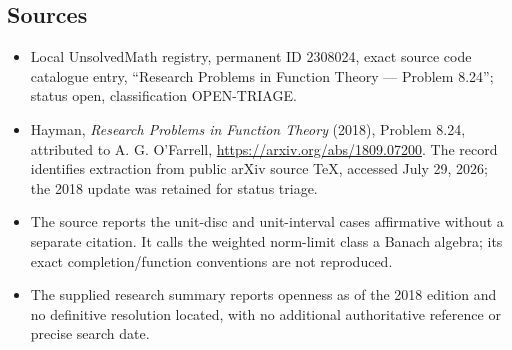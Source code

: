 \documentclass[11pt]{article}
\begin{document}
\subsection{Sources}
\begin{itemize}
\item Local UnsolvedMath registry, permanent ID 2308024, exact source code catalogue entry, ``Research Problems in Function Theory --- Problem 8.24''; status open, classification OPEN-TRIAGE.
\item Hayman, \emph{Research Problems in Function Theory} (2018), Problem 8.24, attributed to A. G. O'Farrell, \url{https://arxiv.org/abs/1809.07200}. The record identifies extraction from public arXiv source TeX, accessed July 29, 2026; the 2018 update was retained for status triage.
\item The source reports the unit-disc and unit-interval cases affirmative without a separate citation. It calls the weighted norm-limit class a Banach algebra; its exact completion/function conventions are not reproduced.
\item The supplied research summary reports openness as of the 2018 edition and no definitive resolution located, with no additional authoritative reference or precise search date.
\end{itemize}
\end{document}
